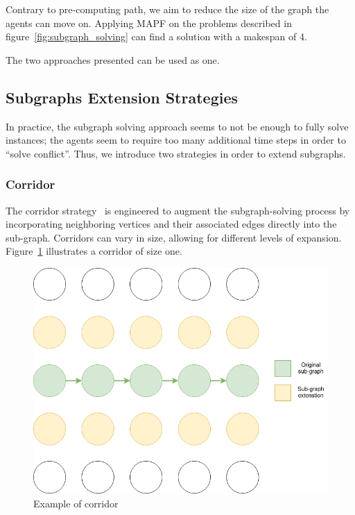 Contrary to pre-computing path, we aim to reduce the size of the graph the agents can move on. Applying MAPF on the problems described in figure~\ref{fig:subgraph_solving} can find a solution with a makespan of 4.

The two approaches presented can be used as one. 

\subsection{Subgraphs Extension Strategies}

In practice, the subgraph solving approach seems to not be enough to fully solve instances; the agents seem to require too many additional time steps in order to ``solve conflict''. Thus, we introduce two strategies in order to extend subgraphs. 

\subsubsection{Corridor}

The corridor strategy~\cite{surynek2023candidate} is engineered to augment the subgraph-solving process by incorporating neighboring vertices and their associated edges directly into the sub-graph. Corridors can vary in size, allowing for different levels of expansion. Figure~\ref{img:corridor} illustrates a corridor of size one.

\begin{figure}[H]
    \centering
    \caption{Example of corridor}\label{img:corridor}
    \includegraphics[width=\widthimg]{img/corridor.drawio.png}
\end{figure}

